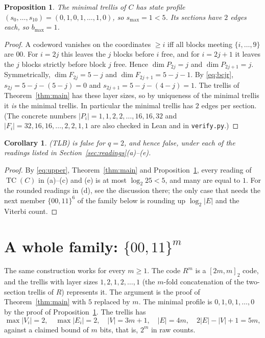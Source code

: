 \documentclass[11pt]{article}
\newtheorem{proposition}[theorem]{Proposition}
\newtheorem{corollary}[theorem]{Corollary}
\theoremstyle{definition}
\theoremstyle{remark}
\newcommand{\smax}{s_{\max}}
\begin{document}
\begin{proposition}\label{prop:bcjr}
The minimal trellis of $C$ has state profile $(s_0,\dots,s_{10})=(0,1,0,1,\dots,1,0)$,
so $\smax=1<5$. Its sections have $2$ edges each, so $b_{\max}=1$.
\end{proposition}
\begin{proof}
A codeword vanishes on the coordinates $\ge i$ iff all blocks meeting
$\{i,\dots,9\}$ are $00$. For $i=2j$ this leaves the $j$ blocks before $i$ free, and for
$i=2j+1$ it leaves the $j$ blocks strictly before block $j$ free. Hence $\dim P_{2j}=j$
and $\dim P_{2j+1}=j$. Symmetrically, $\dim F_{2j}=5-j$ and $\dim F_{2j+1}=5-j-1$. By
\eqref{eq:bcjr}, $s_{2j}=5-j-(5-j)=0$ and $s_{2j+1}=5-j-(4-j)=1$. The trellis of
Theorem~\ref{thm:main} has these layer sizes, so by uniqueness of the minimal trellis it
\emph{is} the minimal trellis. In particular the minimal trellis has $2$ edges per
section. (The concrete numbers $|P_i|=1,1,2,2,\dots,16,16,32$ and
$|F_i|=32,16,16,\dots,2,2,1,1$ are also checked in Lean and in \texttt{verify.py}.)
\end{proof}

\begin{corollary}\label{cor:main}
(TLB) is false for $q=2$, and hence false, under each of the readings listed in
Section~\ref{sec:readings}(a)--(e).
\end{corollary}
\begin{proof}
By \eqref{eq:upper}, Theorem~\ref{thm:main} and Proposition~\ref{prop:bcjr}, every
reading of $\operatorname{TC}(C)$ in (a)--(c) and (e) is at most $\log_2 25<5$, and many are
equal to $1$. For the rounded readings in (d), see the discussion there; the only case
that needs the next member $\{00,11\}^6$ of the family below is rounding up $\log_2|E|$ and the Viterbi count.
\end{proof}

\section{\texorpdfstring{A whole family: $\{00,11\}^m$}{A whole family: (00,11)\^{}m}}
The same construction works for every $m\ge1$. The code $R^m$ is a $[2m,m]_2$ code, and
the trellis with layer sizes $1,2,1,2,\dots,1$ (the $m$-fold concatenation of the
two-section trellis of $R$) represents it. The argument is the proof of
Theorem~\ref{thm:main} with $5$ replaced by $m$. The minimal profile is
$0,1,0,1,\dots,0$ by the proof of Proposition~\ref{prop:bcjr}. The trellis has
\[
\max|V_i|=2,\quad\max|E_i|=2,\quad |V|=3m+1,\quad |E|=4m,\quad 2|E|-|V|+1=5m,
\]
against a claimed bound of $m$ bits, that is, $2^m$ in raw counts.
\end{document}

